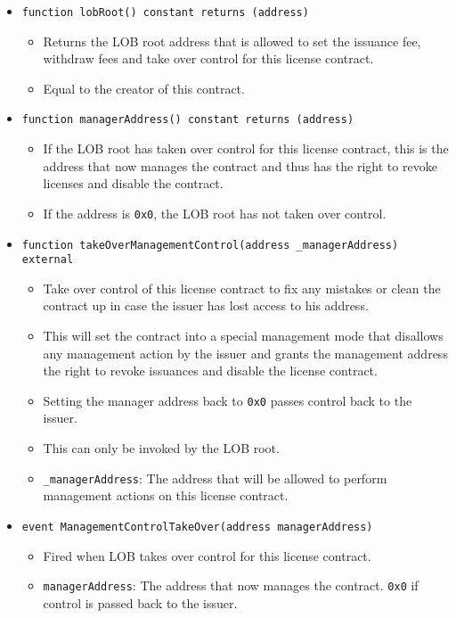\documentclass[a4paper]{article}
\begin{document}
\begin{itemize}
  \item \texttt{function lobRoot() constant returns (address)}
  \begin{itemize}
    \item Returns the LOB root address that is allowed to set the issuance fee, withdraw fees and take over control for this license contract. 
    \item Equal to the creator of this contract.
  \end{itemize}
  
  \item \texttt{function managerAddress() constant returns (address)}
  \begin{itemize}
    \item If the LOB root has taken over control for this license contract, this is the address that now manages the contract and thus has the right to revoke licenses and disable the contract.
    \item If the address is \texttt{0x0}, the LOB root has not taken over control.
  \end{itemize}
  
  \item \texttt{function takeOverManagementControl(address \_managerAddress) external}
  \begin{itemize}
    \item Take over control of this license contract to fix any mistakes or clean the contract up in case the issuer has lost access to his address. 
    \item This will set the contract into a special management mode that disallows any management action by the issuer and grants the management address the right to revoke issuances and disable the license contract.
    \item Setting the manager address back to \texttt{0x0} passes control back to the issuer.
    \item This can only be invoked by the LOB root.
    \item \texttt{\_managerAddress}: The address that will be allowed to perform management actions on this license contract.
  \end{itemize}
  
  \item \texttt{event ManagementControlTakeOver(address managerAddress)}
  \begin{itemize}
    \item Fired when LOB takes over control for this license contract.
    \item \texttt{managerAddress}: The address that now manages the contract. \texttt{0x0} if control is passed back to the issuer.
  \end{itemize}
  

\end{itemize}
\end{document}
